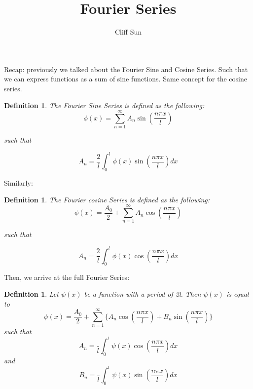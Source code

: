 \documentclass{article}
\title{Fourier Series}
\author{Cliff Sun}
\newtheorem{definition}[theorem]{Definition}
\begin{document}
\maketitle

Recap: previously we talked about the Fourier Sine and Cosine Series. Such that
we can express functions as a sum of sine functions. Same concept for the cosine series. 


\begin{definition}
    The Fourier Sine Series is defined as the following:
\begin{equation}
    \phi(x) = \sum_{n=1}^{\infty}A_n\sin(\frac{n\pi x}{l})
\end{equation}

such that 

\begin{equation}
    A_n = \frac{2}{l}\int_{0}^{l}\phi(x)\sin(\frac{n\pi x}{l})dx
\end{equation}
\end{definition}

Similarly:

\begin{definition}
    The Fourier cosine Series is defined as the following:
\begin{equation}
    \phi(x) = \frac{A_0}{2} + \sum_{n=1}^{\infty}A_n\cos(\frac{n\pi x}{l})
\end{equation}

such that 

\begin{equation}
    A_n = \frac{2}{l}\int_{0}^{l}\phi(x)\cos(\frac{n\pi x}{l})dx
\end{equation}
\end{definition}

Then, we arrive at the full Fourier Series:

\begin{definition}
    Let $\psi(x)$ be a function with a period of 2l. Then $\psi(x)$ is equal to 
    \begin{equation}
        \psi(x) = \frac{A_0}{2} + \sum_{n=1}^{\infty}\{A_n\cos(\frac{n\pi x}{l}) + B_n\sin(\frac{n\pi x}{l})\}
    \end{equation}
    such that 
    \begin{equation}
        A_n = \frac{}{l}\int_{0}^{l}\psi(x)\cos(\frac{n\pi x}{l})dx
    \end{equation}
    and
    \begin{equation}
        B_n = \frac{}{l}\int_{0}^{l}\psi(x)\sin(\frac{n\pi x}{l})dx
    \end{equation}
\end{definition}
\end{document}
